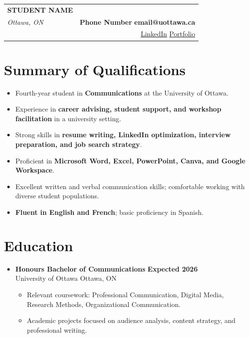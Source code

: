 \documentclass[a4paper,9pt]{article} %
\begin{document}
\vspace*{-0.2cm}
\noindent
\begin{tabularx}{\textwidth}{@{}Xr@{}}
    {\LARGE \textbf{STUDENT NAME}} & \\[-2pt]
    \textit{Ottawa, ON} &
    \textbf{Phone Number} \quad \textbf{email@uottawa.ca} \\[-2pt]
    &
    \href{https://linkedin.com}{LinkedIn} \quad
    \href{https://portfolio.com}{Portfolio}
\end{tabularx}

\section{Summary of Qualifications}
\begin{itemize}[leftmargin=0.15in, label={\textbullet}]
    \item Fourth-year student in \textbf{Communications} at the University of Ottawa.
    \item Experience in \textbf{career advising, student support, and workshop facilitation} in a university setting.
    \item Strong skills in \textbf{resume writing, LinkedIn optimization, interview preparation, and job search strategy}.
    \item Proficient in \textbf{Microsoft Word, Excel, PowerPoint, Canva, and Google Workspace}.
    \item Excellent written and verbal communication skills; comfortable working with diverse student populations.
    \item \textbf{Fluent in English and French}; basic proficiency in Spanish.
\end{itemize}

\section{Education}
\begin{itemize}[leftmargin=0.15in, label={}]
    \item \textbf{Honours Bachelor of Communications} \hfill \textbf{Expected 2026}\\
    University of Ottawa \hfill Ottawa, ON
    \begin{itemize}[leftmargin=0.3in, label={-}]
        \item Relevant coursework: Professional Communication, Digital Media, Research Methods, Organizational Communication.
        \item Academic projects focused on audience analysis, content strategy, and professional writing.
    \end{itemize}
\end{itemize}
\end{document}
